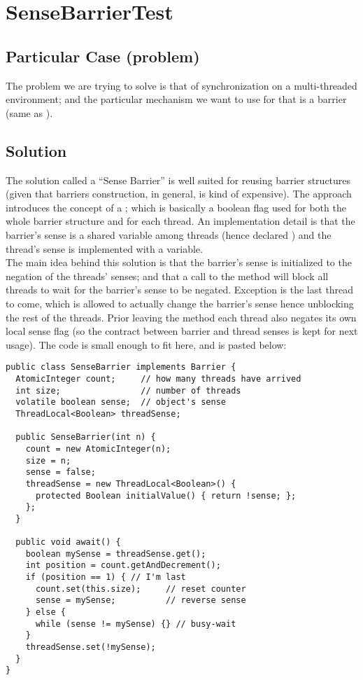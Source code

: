 \section{\textbf{SenseBarrierTest}}

\subsection{Particular Case (problem)}
The problem we are trying to solve is that of synchronization on a
multi-threaded environment; and the particular mechanism we want to
use for that is a barrier (same as ).

\subsection{Solution}
The solution called a ``Sense Barrier'' is well suited for reusing
barrier structures (given that barriers construction, in general, is
kind of expensive). The approach introduces the concept of a ; which
is basically a boolean flag used for both the whole barrier structure
and for each thread. An implementation detail is that the barrier's
sense is a shared variable among threads (hence declared )
and the thread's sense is implemented with a 
variable. \\

The main idea behind this solution is that the barrier's sense is
initialized to the negation of the threads' senses; and that a call to
the  method will block all threads to wait for the barrier's
sense to be negated. Exception is the last thread to come, which is
allowed to actually change the barrier's sense hence unblocking the
rest of the threads. Prior leaving the
method each thread also negates its own local sense flag (so the
contract between barrier and thread senses is kept for next
usage). The code is small enough to fit here, and is pasted below: \\

\begin{lstlisting}[style=numbers]
public class SenseBarrier implements Barrier {
  AtomicInteger count;     // how many threads have arrived
  int size;                // number of threads
  volatile boolean sense;  // object's sense
  ThreadLocal<Boolean> threadSense;
  
  public SenseBarrier(int n) {
    count = new AtomicInteger(n);
    size = n;
    sense = false;
    threadSense = new ThreadLocal<Boolean>() {
      protected Boolean initialValue() { return !sense; };
    };
  }

  public void await() {
    boolean mySense = threadSense.get();
    int position = count.getAndDecrement();
    if (position == 1) { // I'm last
      count.set(this.size);     // reset counter
      sense = mySense;          // reverse sense
    } else {
      while (sense != mySense) {} // busy-wait
    }
    threadSense.set(!mySense);
  }
}
\end{lstlisting}
\hfill

